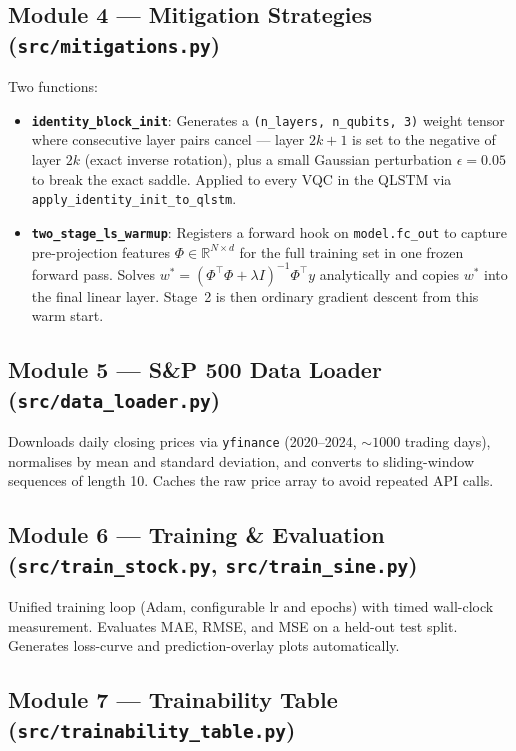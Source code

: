 \documentclass[10pt,twocolumn]{article}
\begin{document}
\subsection*{Module 4 — Mitigation Strategies (\texttt{src/mitigations.py})}

Two functions:

\begin{itemize}
  \item \textbf{\texttt{identity\_block\_init}}: Generates a \texttt{(n\_layers, n\_qubits, 3)} weight tensor where consecutive layer pairs cancel — layer $2k{+}1$ is set to the negative of layer $2k$ (exact inverse rotation), plus a small Gaussian perturbation $\epsilon{=}0.05$ to break the exact saddle. Applied to every VQC in the QLSTM via \texttt{apply\_identity\_init\_to\_qlstm}.
  \item \textbf{\texttt{two\_stage\_ls\_warmup}}: Registers a forward hook on \texttt{model.fc\_out} to capture pre-projection features $\Phi \in \mathbb{R}^{N \times d}$ for the full training set in one frozen forward pass. Solves $w^* = (\Phi^\top\Phi + \lambda I)^{-1}\Phi^\top y$ analytically and copies $w^*$ into the final linear layer. Stage~2 is then ordinary gradient descent from this warm start.
\end{itemize}

\subsection*{Module 5 — S\&P 500 Data Loader (\texttt{src/data\_loader.py})}

Downloads daily closing prices via \texttt{yfinance} (2020--2024, ${\sim}1000$ trading days), normalises by mean and standard deviation, and converts to sliding-window sequences of length 10. Caches the raw price array to avoid repeated API calls.

\subsection*{Module 6 — Training \& Evaluation (\texttt{src/train\_stock.py}, \texttt{src/train\_sine.py})}

Unified training loop (Adam, configurable lr and epochs) with timed wall-clock measurement. Evaluates MAE, RMSE, and MSE on a held-out test split. Generates loss-curve and prediction-overlay plots automatically.

\subsection*{Module 7 — Trainability Table (\texttt{src/trainability\_table.py})}
\end{document}
